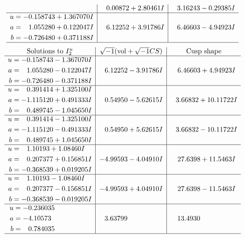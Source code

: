 \documentclass[1p]{elsarticle_modified}
\theoremstyle{definition}
\newcommand{\I}{\sqrt{-1}}
\begin{document}
$$\begin{array}{c|c|c}
 & \phantom{-}0.00872 + 2.80461 I & \phantom{-}3.16243 - 0.29385 I \\ \hline\begin{aligned}
u &= -0.158743 + 1.367070 I \\
a &= \phantom{-}1.055280 + 0.122047 I \\
b &= -0.726480 + 0.371188 I\end{aligned}
 & \phantom{-}6.12252 + 3.91786 I & \phantom{-}6.46603 - 4.94923 I\\
 \hline 
 \end{array}$$\newpage$$\begin{array}{c|c|c}  
\text{Solutions to }I^u_{2}& \I (\text{vol} + \sqrt{-1}CS) & \text{Cusp shape}\\
 \hline 
\begin{aligned}
u &= -0.158743 - 1.367070 I \\
a &= \phantom{-}1.055280 - 0.122047 I \\
b &= -0.726480 - 0.371188 I\end{aligned}
 & \phantom{-}6.12252 - 3.91786 I & \phantom{-}6.46603 + 4.94923 I \\ \hline\begin{aligned}
u &= \phantom{-}0.391414 + 1.325100 I \\
a &= -1.115120 + 0.491333 I \\
b &= \phantom{-}0.489745 - 1.045650 I\end{aligned}
 & \phantom{-}0.54950 - 5.62615 I & \phantom{-}3.66832 + 10.11722 I \\ \hline\begin{aligned}
u &= \phantom{-}0.391414 - 1.325100 I \\
a &= -1.115120 - 0.491333 I \\
b &= \phantom{-}0.489745 + 1.045650 I\end{aligned}
 & \phantom{-}0.54950 + 5.62615 I & \phantom{-}3.66832 - 10.11722 I \\ \hline\begin{aligned}
u &= \phantom{-}1.10193 + 1.08460 I \\
a &= \phantom{-}0.207377 + 0.156851 I \\
b &= -0.368539 + 0.019205 I\end{aligned}
 & -4.99593 - 4.04910 I & \phantom{-}27.6398 + 11.5463 I \\ \hline\begin{aligned}
u &= \phantom{-}1.10193 - 1.08460 I \\
a &= \phantom{-}0.207377 - 0.156851 I \\
b &= -0.368539 - 0.019205 I\end{aligned}
 & -4.99593 + 4.04910 I & \phantom{-}27.6398 - 11.5463 I \\ \hline\begin{aligned}
u &= -0.236035\phantom{ +0.000000I} \\
a &= -4.10573\phantom{ +0.000000I} \\
b &= \phantom{-}0.784035\phantom{ +0.000000I}\end{aligned}
 & \phantom{-}3.63799\phantom{ +0.000000I} & \phantom{-}13.4930\phantom{ +0.000000I}\\
 \hline 
 \end{array}$$\newpage\newpage\renewcommand{\arraystretch}{1}
\end{document}
